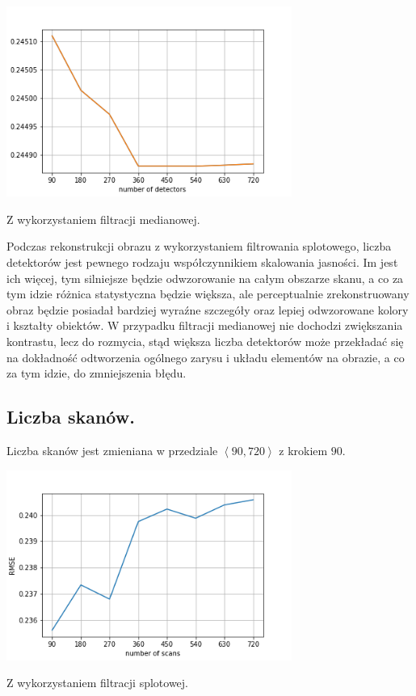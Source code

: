 \documentclass[a4paper, 11pt]{article}
\begin{document}
\begin{center}
	\includegraphics[width=0.7\textwidth]{detectors_no_convolve.txt.png}
	
	Z wykorzystaniem filtracji medianowej.
\end{center}

Podczas rekonstrukcji obrazu z wykorzystaniem filtrowania splotowego, liczba detektorów jest pewnego rodzaju współczynnikiem skalowania jasności. Im jest ich więcej, tym silniejsze będzie odwzorowanie na całym obszarze skanu, a co za tym idzie różnica statystyczna będzie większa, ale perceptualnie zrekonstruowany obraz będzie posiadał bardziej wyraźne szczegóły oraz lepiej odwzorowane kolory i kształty obiektów. W przypadku filtracji medianowej nie dochodzi zwiększania kontrastu, lecz do rozmycia, stąd większa liczba detektorów może przekładać się na dokładność odtworzenia ogólnego zarysu i układu elementów na obrazie, a co za tym idzie,  do zmniejszenia błędu.


\newpage
\subsection{Liczba skanów.}

Liczba skanów jest zmieniana w przedziale $\left<90, 720 \right>$ z krokiem $90$.

\begin{center}
	\includegraphics[width=0.7\textwidth]{scans.png}
	
	Z wykorzystaniem filtracji splotowej.
\end{center}
\end{document}
